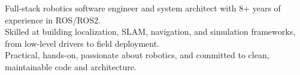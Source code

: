 

\begin{cvparagraph}

Full‑stack robotics software engineer and system architect with 8+ years of experience in ROS/ROS2.\\ 
Skilled at building localization, SLAM, navigation, and simulation frameworks, from low-level drivers to field deployment.\\
Practical, hands-on, passionate about robotics, and committed to clean, maintainable code and architecture.
\end{cvparagraph}
